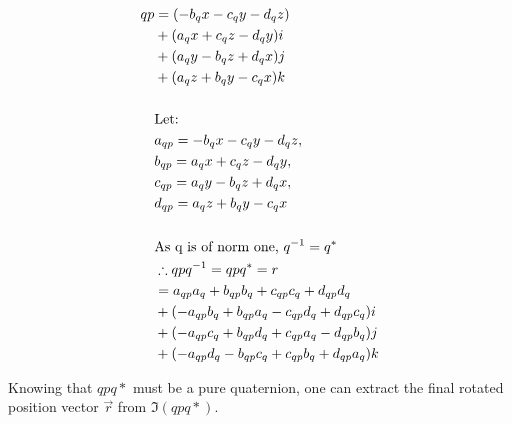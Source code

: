 \documentclass[12pt, a4paper]{article}
\begin{document}
\begin{align*}
    qp     & = (- b_qx - c_qy - d_qz)                \\
           & + (a_qx + c_qz - d_qy)i               \\
           & + (a_qy - b_qz + d_qx)j               \\
           & + (a_qz + b_qy - c_qx )k               \\ \\
           & \text{Let:\space}                                    \\
           &a_{qp} =- b_qx - c_qy - d_qz,                 \\
           &b_{qp} = a_qx + c_qz - d_qy,                 \\
           &c_{qp} = a_qy - b_qz + d_qx,                 \\
           &d_{qp} = a_qz + b_qy - c_qx                  \\
    \\
           & \text{As q is of norm one, } q^{-1} = q^*            \\
           & \therefore qpq^{-1} = qpq^* = r                      \\
           & = a_{qp}a_q + b_{qp}b_q + c_{qp}c_q + d_{qp}d_q      \\
           & + (- a_{qp}b_q + b_{qp}a_q - c_{qp}d_q + d_{qp}c_q)i \\
           & + (- a_{qp}c_q + b_{qp}d_q + c_{qp}a_q - d_{qp}b_q)j \\
           & + (- a_{qp}d_q - b_{qp}c_q + c_{qp}b_q + d_{qp}a_q)k \\
\end{align*}

Knowing that $qpq*$ must be a pure quaternion, one can extract the final rotated
position vector $\vec{r}$ from $\Im(qpq*)$.
\end{document}

